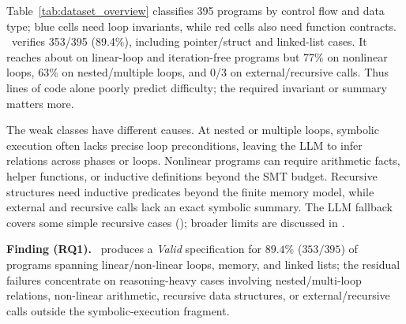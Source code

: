 Table~\ref{tab:dataset_overview} classifies 395 programs by control flow and
data type; blue cells need loop invariants, while red cells also need function
contracts. \toolname\ verifies 353/395 (89.4\%), including pointer/struct and
linked-list cases. It reaches about  on linear-loop and iteration-free
programs but 77\% on nonlinear loops, 63\% on nested/multiple loops, and
0/3 on external/recursive calls. Thus lines of code alone poorly predict
difficulty; the required invariant or summary matters more.

The weak classes have different causes. At nested or multiple loops,
symbolic execution often lacks precise loop preconditions, leaving the LLM
to infer relations across phases or loops. Nonlinear programs can require
arithmetic facts, helper functions, or inductive definitions beyond the SMT
budget. Recursive structures need inductive predicates beyond the finite
memory model, while external and recursive calls lack an exact symbolic
summary. The LLM fallback covers some simple recursive cases
(); broader limits are discussed in
.

\begin{finding}
\textbf{Finding (RQ1).} \toolname\ produces a \emph{Valid} specification for $89.4\%$ ($353/395$) of programs spanning linear/non-linear loops, memory, and linked lists; the residual failures concentrate on reasoning-heavy cases involving nested/multi-loop relations, non-linear arithmetic, recursive data structures, or external/recursive calls outside the symbolic-execution fragment.
\end{finding}
